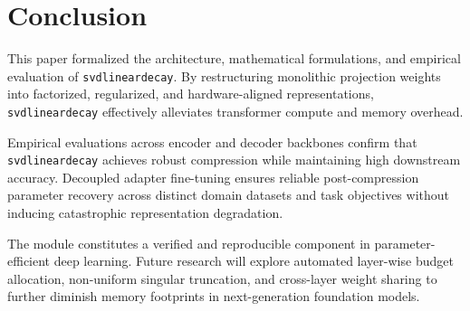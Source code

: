 \section{Conclusion}
This paper formalized the architecture, mathematical formulations, and empirical evaluation of \texttt{svdlineardecay}. By restructuring monolithic projection weights into factorized, regularized, and hardware-aligned representations, \texttt{svdlineardecay} effectively alleviates transformer compute and memory overhead.

Empirical evaluations across encoder and decoder backbones confirm that \texttt{svdlineardecay} achieves robust compression while maintaining high downstream accuracy. Decoupled adapter fine-tuning ensures reliable post-compression parameter recovery across distinct domain datasets and task objectives without inducing catastrophic representation degradation.

The module constitutes a verified and reproducible component in parameter-efficient deep learning. Future research will explore automated layer-wise budget allocation, non-uniform singular truncation, and cross-layer weight sharing to further diminish memory footprints in next-generation foundation models.

